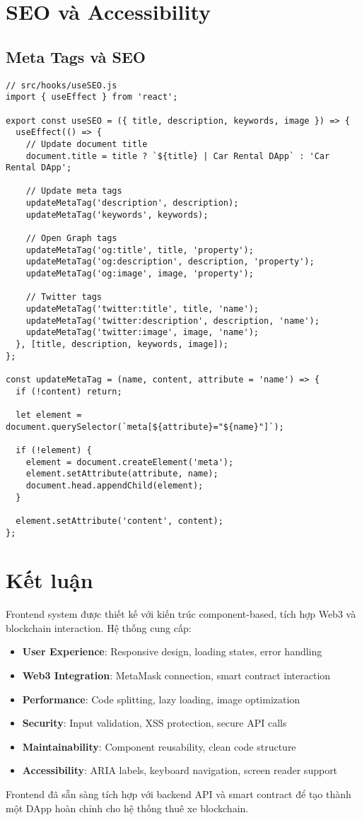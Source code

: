 \documentclass[12pt,a4paper]{article}
\begin{document}
\section{SEO và Accessibility}

\subsection{Meta Tags và SEO}
\begin{lstlisting}[caption=SEO Optimization]
// src/hooks/useSEO.js
import { useEffect } from 'react';

export const useSEO = ({ title, description, keywords, image }) => {
  useEffect(() => {
    // Update document title
    document.title = title ? `${title} | Car Rental DApp` : 'Car Rental DApp';

    // Update meta tags
    updateMetaTag('description', description);
    updateMetaTag('keywords', keywords);
    
    // Open Graph tags
    updateMetaTag('og:title', title, 'property');
    updateMetaTag('og:description', description, 'property');
    updateMetaTag('og:image', image, 'property');
    
    // Twitter tags
    updateMetaTag('twitter:title', title, 'name');
    updateMetaTag('twitter:description', description, 'name');
    updateMetaTag('twitter:image', image, 'name');
  }, [title, description, keywords, image]);
};

const updateMetaTag = (name, content, attribute = 'name') => {
  if (!content) return;
  
  let element = document.querySelector(`meta[${attribute}="${name}"]`);
  
  if (!element) {
    element = document.createElement('meta');
    element.setAttribute(attribute, name);
    document.head.appendChild(element);
  }
  
  element.setAttribute('content', content);
};
\end{lstlisting}

\section{Kết luận}

Frontend system được thiết kế với kiến trúc component-based, tích hợp Web3 và blockchain interaction. Hệ thống cung cấp:

\begin{itemize}
    \item \textbf{User Experience}: Responsive design, loading states, error handling
    \item \textbf{Web3 Integration}: MetaMask connection, smart contract interaction
    \item \textbf{Performance}: Code splitting, lazy loading, image optimization
    \item \textbf{Security}: Input validation, XSS protection, secure API calls
    \item \textbf{Maintainability}: Component reusability, clean code structure
    \item \textbf{Accessibility}: ARIA labels, keyboard navigation, screen reader support
\end{itemize}

Frontend đã sẵn sàng tích hợp với backend API và smart contract để tạo thành một DApp hoàn chỉnh cho hệ thống thuê xe blockchain.
\end{document}
